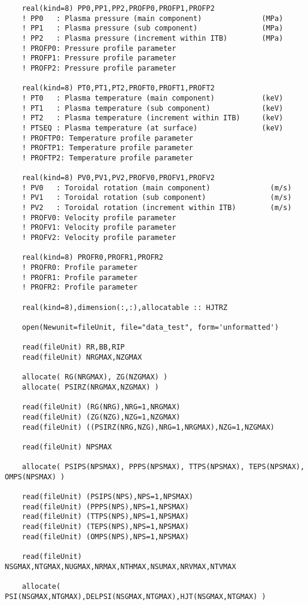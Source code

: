\documentclass[11pt,a4paper]{article}
\begin{document}
\begin{lstlisting}
	real(kind=8) PP0,PP1,PP2,PROFP0,PROFP1,PROFP2
	! PP0   : Plasma pressure (main component)              (MPa)
	! PP1   : Plasma pressure (sub component)               (MPa)
	! PP2   : Plasma pressure (increment within ITB)        (MPa)
	! PROFP0: Pressure profile parameter
	! PROFP1: Pressure profile parameter
	! PROFP2: Pressure profile parameter
	
	real(kind=8) PT0,PT1,PT2,PROFT0,PROFT1,PROFT2
	! PT0   : Plasma temperature (main component)           (keV)
	! PT1   : Plasma temperature (sub component)            (keV)
	! PT2   : Plasma temperature (increment within ITB)     (keV)
	! PTSEQ : Plasma temperature (at surface)               (keV)
	! PROFTP0: Temperature profile parameter
	! PROFTP1: Temperature profile parameter
	! PROFTP2: Temperature profile parameter    
	
	real(kind=8) PV0,PV1,PV2,PROFV0,PROFV1,PROFV2
	! PV0   : Toroidal rotation (main component)              (m/s)
	! PV1   : Toroidal rotation (sub component)               (m/s)
	! PV2   : Toroidal rotation (increment within ITB)        (m/s)
	! PROFV0: Velocity profile parameter
	! PROFV1: Velocity profile parameter
	! PROFV2: Velocity profile parameter
	
	real(kind=8) PROFR0,PROFR1,PROFR2
	! PROFR0: Profile parameter
	! PROFR1: Profile parameter
	! PROFR2: Profile parameter
	
	real(kind=8),dimension(:,:),allocatable :: HJTRZ
	
	open(Newunit=fileUnit, file="data_test", form='unformatted')
	
	read(fileUnit) RR,BB,RIP
	read(fileUnit) NRGMAX,NZGMAX
	
	allocate( RG(NRGMAX), ZG(NZGMAX) )
	allocate( PSIRZ(NRGMAX,NZGMAX) )
	
	read(fileUnit) (RG(NRG),NRG=1,NRGMAX)
	read(fileUnit) (ZG(NZG),NZG=1,NZGMAX)
	read(fileUnit) ((PSIRZ(NRG,NZG),NRG=1,NRGMAX),NZG=1,NZGMAX)
	
	read(fileUnit) NPSMAX
	
	allocate( PSIPS(NPSMAX), PPPS(NPSMAX), TTPS(NPSMAX), TEPS(NPSMAX), OMPS(NPSMAX) )
	
	read(fileUnit) (PSIPS(NPS),NPS=1,NPSMAX)
	read(fileUnit) (PPPS(NPS),NPS=1,NPSMAX)
	read(fileUnit) (TTPS(NPS),NPS=1,NPSMAX)
	read(fileUnit) (TEPS(NPS),NPS=1,NPSMAX)
	read(fileUnit) (OMPS(NPS),NPS=1,NPSMAX)
	
	read(fileUnit) NSGMAX,NTGMAX,NUGMAX,NRMAX,NTHMAX,NSUMAX,NRVMAX,NTVMAX
	
	allocate( PSI(NSGMAX,NTGMAX),DELPSI(NSGMAX,NTGMAX),HJT(NSGMAX,NTGMAX) )
	

\end{lstlisting}
\end{document}
